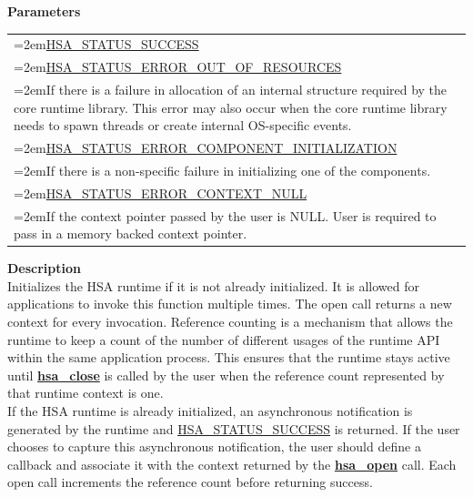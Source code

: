 \documentclass[final]{book}
\newcommand{\hsaarg}[1]{\textit{#1}}
\newcommand{\reffun}[1]{\textbf{#1}}
\begin{document}
\begin{appendices}
\noindent\textbf{Parameters}\\[-6mm]
\noindent\begin{longtable}{@{}>{\hangindent=2em}p{\textwidth}}
\hsaarg{context}\\\hspace{2em}(out) A valid pointer to a runtime context.
\end{longtable}
\vspace{-5mm}\noindent\textbf{Return Values}\\[-6mm]
\noindent\begin{longtable}{@{}>{\hangindent=2em}p{\linewidth}}
\hyperlink{group--status-1ggad755322e7ff95456520e8abdbe90d225ae382ea0c9c05cce5a60d0317375159cc}{HSA_STATUS_SUCCESS}\\[2mm]
\hyperlink{group--status-1ggad755322e7ff95456520e8abdbe90d225a1a77fcf36d0d140874c4361ab093eff7}{HSA_STATUS_ERROR_OUT_OF_RESOURCES}\\\hspace{2em}If there is a failure in allocation of an internal structure required by the core runtime library. This error may also occur when the core runtime library needs to spawn threads or create internal OS-specific events.\\[2mm]
\hyperlink{group--status-1ggad755322e7ff95456520e8abdbe90d225ac2b1926b00231fd6a7695c1470c43ef6}{HSA_STATUS_ERROR_COMPONENT_INITIALIZATION}\\\hspace{2em}If there is a non-specific failure in initializing one of the components.\\[2mm]
\hyperlink{group--status-1ggad755322e7ff95456520e8abdbe90d225a2ae9f2db427b200c2709bac49f4cabfb}{HSA_STATUS_ERROR_CONTEXT_NULL}\\\hspace{2em}If the context pointer passed by the user is NULL. User is required to pass in a memory backed context pointer.
\end{longtable}
\vspace{-4mm}\noindent\textbf{Description}\\[1mm]
Initializes the HSA runtime if it is not already initialized. It is allowed for applications to invoke this function multiple times. The open call returns a new context for every invocation. Reference counting is a mechanism that allows the runtime to keep a count of the number of different usages of the runtime API within the same application process. This ensures that the runtime stays active until \hyperlink{group--context-1gae008f9f4f2d3939b2ccd1c378b8cc4f0}{\reffun{hsa_close}} is called by the user when the reference count represented by that runtime context is one.\\[2mm]
If the HSA runtime is already initialized, an asynchronous notification is generated by the runtime and \hyperlink{group--status-1ggad755322e7ff95456520e8abdbe90d225ae382ea0c9c05cce5a60d0317375159cc}{HSA_STATUS_SUCCESS} is returned. If the user chooses to capture this asynchronous notification, the user should define a callback and associate it with the context returned by the \hyperlink{group--context-1gab45607a30ab05c95dfe692115fe1f2a4}{\reffun{hsa_open}} call. Each open call increments the reference count before returning success. 



\end{appendices}
\end{document}

